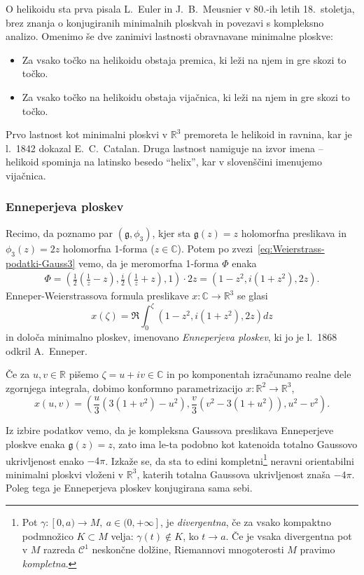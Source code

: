 \documentclass[12pt,a4paper,twoside]{article}
\theoremstyle{definition} %
\theoremstyle{plain} %
\numberwithin{equation}{section}  %
\begin{document}
O helikoidu sta prva pisala L.~Euler in J.~B.~Meusnier v 80.-ih letih 18.~stoletja, brez znanja o konjugiranih minimalnih ploskvah in povezavi s kompleksno analizo. Omenimo še dve zanimivi lastnosti obravnavane minimalne ploskve:
\begin{itemize}
\item Za vsako točko na helikoidu obstaja premica, ki leži na njem in gre skozi to točko.
\item Za vsako točko na helikoidu obstaja vijačnica, ki leži na njem in gre skozi to točko.
\end{itemize}
Prvo lastnost kot minimalni ploskvi v $\mathbb{R}^3$ premoreta le helikoid in ravnina, kar je l.~1842 dokazal E.~C.~Catalan. Druga lastnost namiguje na izvor imena -- helikoid spominja na latinsko besedo ``helix'', kar v slovenščini imenujemo vijačnica.

\subsubsection{Enneperjeva ploskev}
%
Recimo, da poznamo par $(\mathfrak{g}, \phi_3)$, kjer sta $\mathfrak{g}(z) = z$ holomorfna preslikava in $\phi_3(z) = 2z$ holomorfna 1-forma ($z \in \mathbb{C}$).
Potem po zvezi~\eqref{eq:Weierstrass-podatki-Gauss3} vemo, da je meromorfna 1-forma $\Phi$ enaka
\begin{gather*}
\Phi = \left( \frac{1}{2} \left( \frac{1}{z} - z \right), \frac{i}{2} \left( \frac{1}{z} + z \right), 1 \right) \cdot 2z = \left( 1-z^2, i(1+z^2), 2z \right).
\end{gather*}
Enneper-Weierstrassova formula preslikave $x \colon \mathbb{C} \to \mathbb{R}^3$ se glasi
\begin{equation}
x(\zeta) = \Re \int_{0}^{\zeta} \left( 1-z^2, i(1+z^2), 2z \right) dz
\end{equation}
in določa minimalno ploskev, imenovano \emph{Enneperjeva ploskev}, ki jo je l.~1868 odkril A.~Enneper.

Če za $ u,v \in \mathbb{R}$ pišemo $\zeta = u + iv \in \mathbb{C}$ in po komponentah izračunamo realne dele zgornjega integrala, dobimo konformno parametrizacijo $x \colon \mathbb{R}^2 \to \mathbb{R}^3$,
\begin{equation}
x(u,v) = \left( \frac{u}{3} \left(3(1+v^2) - u^2 \right), \frac{v}{3} \left( v^2 - 3(1+u^2) \right), u^2 - v^2 \right).
\end{equation}

Iz izbire podatkov vemo, da je kompleksna Gaussova preslikava Enneperjeve ploskve enaka $\mathfrak{g}(z) = z$, zato ima le-ta podobno kot katenoida totalno Gaussovo ukrivljenost enako $-4 \pi$. Izkaže se, da sta to edini kompletni\footnote{Pot $\gamma \colon [0,a) \to M, \ a \in (0,+\infty]$, je \emph{divergentna}, če za vsako kompaktno podmnožico $K \subset M$ velja: $\gamma(t) \notin K$, ko $t \to a$. Če je vsaka divergentna pot v $M$ razreda $\mathcal{C}^{1}$ neskončne dolžine, Riemannovi mnogoterosti $M$ pravimo \emph{kompletna}.} neravni orientabilni minimalni ploskvi vloženi v $\mathbb{R}^3$, katerih totalna Gaussova ukrivljenost znaša $-4 \pi$. Poleg tega je Enneperjeva ploskev konjugirana sama sebi.
\end{document}
